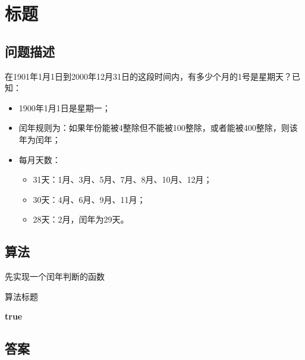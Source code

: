 \section{标题}
\subsection{问题描述}
\begin{tcolorbox}
在1901年1月1日到2000年12月31日的这段时间内，有多少个月的1号是星期天？已知：
\begin{itemize}
    \item 1900年1月1日是星期一；
    \item 闰年规则为：如果年份能被4整除但不能被100整除，或者能被400整除，则该年为闰年；
    \item 每月天数：
    \begin{itemize}
        \item 31天：1月、3月、5月、7月、8月、10月、12月；
        \item 30天：4月、6月、9月、11月；
        \item 28天：2月，闰年为29天。
    \end{itemize}
\end{itemize}
\end{tcolorbox}

\subsection{算法}
先实现一个闰年判断的函数
\begin{algorithm}
	\caption{算法标题}
	\begin{algorithmic}[1]
		\Return \textbf{true}
	\EndIf
	\end{algorithmic}
\end{algorithm}

\subsection{答案}
